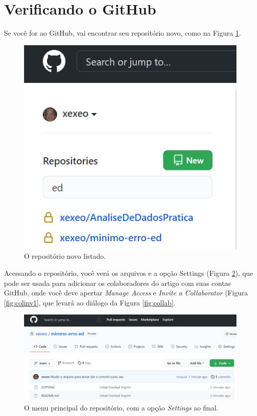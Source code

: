 \documentclass{article}
\begin{document}
\section{Verificando o GitHub}

Se você for ao GitHub, vai encontrar seu repositório novo, como na Figura \ref{fig:repnovo}.

\begin{figure}[hbt]
    \centering
    \includegraphics[width=0.6\linewidth]{Image008.png}
    \caption{O repositório novo listado.}
    \label{fig:repnovo}
\end{figure}

Acessando o repositório, você verá os arquivos e a opção Settings (Figura \ref{fig:menurep}), que pode ser usada para adicionar os colaboradores do artigo com suas contas GitHub, onde você deve apertar \textit{Manage Access} e \textit{Invite a Collaborator} (Figura \ref{fig:colinv1}, que levará ao diálogo da Figura \ref{fig:collab}.

\begin{figure}[hbt]
    \centering
    \includegraphics[width=0.9\linewidth]{Image009.png}
    \caption{O menu principal do repositório, com a opção \textit{Settings} ao final.}
    \label{fig:menurep}
\end{figure}
\end{document}
